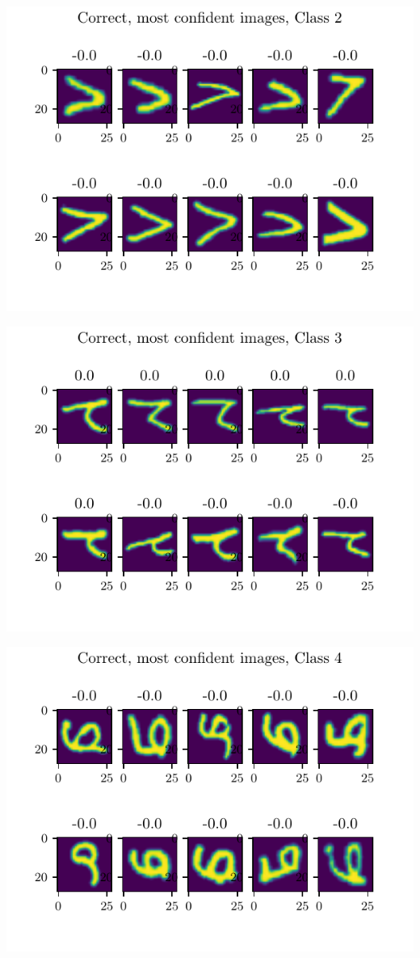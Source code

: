 \documentclass[11pt]{article}
\begin{document}
\includegraphics{figures/2d_confident_imgs_class_2.pdf}

\includegraphics{figures/2d_confident_imgs_class_3.pdf}

\includegraphics{figures/2d_confident_imgs_class_4.pdf}
\end{document}

